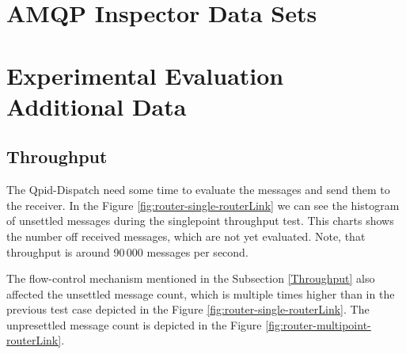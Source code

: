 \chapter{AMQP Inspector Data Sets}
\label{AMQP Inspector Data Sets}

\chapter{Experimental Evaluation Additional Data}
\label{Experimental Evaluation Additional Data}

\section*{Throughput}
The Qpid-Dispatch need some time to evaluate the messages and send them to the receiver. In the Figure \ref{fig:router-single-routerLink} we can see the histogram of unsettled messages during the singlepoint throughput test. This charts shows the number off received messages, which are not yet evaluated. Note, that throughput is around 90\,000 messages per second.

The flow-control mechanism mentioned in the Subsection \ref{Throughput} also affected the unsettled message count, which is multiple times higher than in the previous test case depicted in the Figure \ref{fig:router-single-routerLink}. The unpresettled message count is depicted in the Figure \ref{fig:router-multipoint-routerLink}.

